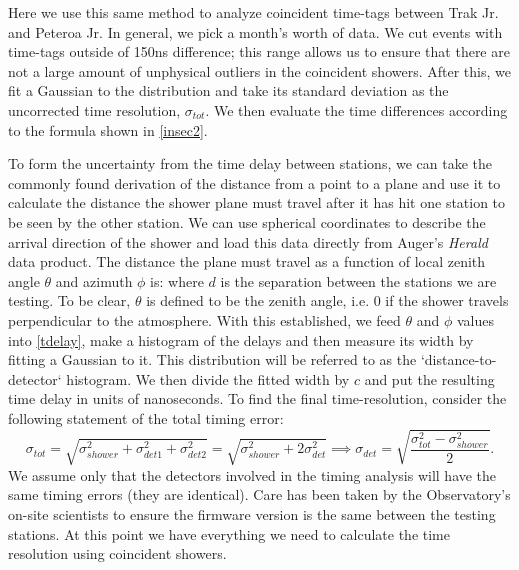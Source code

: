 Here we use this same method to analyze coincident time-tags between Trak Jr. and Peteroa Jr. In general, we pick a month's worth of data. We cut events with time-tags outside of 150ns difference; this range allows us to ensure that there are not a large amount of unphysical outliers in the coincident showers. After this, we fit a Gaussian to the distribution and take its standard deviation as the uncorrected time resolution, $\sigma_{tot}$. We then evaluate the time differences according to the formula shown in \autoref{insec2}.

To form the uncertainty from the time delay between stations, we can take the commonly found derivation of the distance from a point to a plane and use it to calculate the distance the shower plane must travel after it has hit one station to be seen by the other station. We can use spherical coordinates to describe the arrival direction of the shower and load this data directly from Auger's \textit{Herald} data product. The distance the plane must travel as a function of local zenith angle $\theta$ and azimuth $\phi$ is:
where $d$ is the separation between the stations we are testing. To be clear, $\theta$ is defined to be the zenith angle, i.e. 0 if the shower travels perpendicular to the atmosphere. With this established, we feed $\theta$ and $\phi$ values into \autoref{tdelay}, make a histogram of the delays and then measure its width by fitting a Gaussian to it. This distribution will be referred to as the `distance-to-detector` histogram. We then divide the fitted width by $c$ and put the resulting time delay in units of nanoseconds. To find the final time-resolution, consider the following statement of the total timing error:
$$
\sigma_{tot}=\sqrt{\sigma_{shower}^2+\sigma_{det1}^2+\sigma_{det2}^2}=\sqrt{\sigma_{shower}^2+2\sigma_{det}^2}\implies\sigma_{det}=\sqrt{\frac{\sigma_{tot}^2-\sigma_{shower}^2}{2}}.
$$
We assume only that the detectors involved in the timing analysis will have the same timing errors (they are identical). Care has been taken by the Observatory's on-site scientists to ensure the firmware version is the same between the testing stations. At this point we have everything we need to calculate the time resolution using coincident showers.
